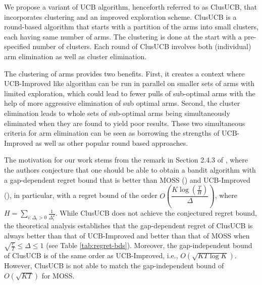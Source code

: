 We propose a variant of UCB algorithm, henceforth referred to as ClusUCB, that incorporates clustering and an improved exploration scheme. ClusUCB is a round-based algorithm that
starts with a partition of the arms into small clusters, each having same number of arms. 
The clustering is done at the start with a pre-specified number of clusters. 
Each round of ClusUCB involves both (individual) arm elimination as well as cluster elimination. 


The clustering of arms provides two benefits. First, it creates a context where UCB-Improved like algorithm can be run in parallel on smaller sets of arms with limited exploration, which could lead to fewer pulls of sub-optimal arms with the help of  more aggressive elimination of sub optimal arms. Second, the cluster elimination leads to whole sets of sub-optimal arms being simultaneously eliminated when they are found to yield poor results. These two simultaneous criteria for arm elimination can be seen as borrowing the strengths of UCB-Improved as well as other popular round based approaches.

The motivation for our work stems from the remark in Section 2.4.3 of \cite{bubeck2012bandits}, where the authors conjecture that one should be able to obtain a bandit algorithm with a
gap-dependent regret bound that is better than MOSS (\cite{audibert2009minimax}) and UCB-Improved (\cite{auer2010ucb}), in particular, with a regret bound of the order 
$O\left(\dfrac{K\log (\frac{T}{H})}{\Delta}\right)$, where $H = \sum_{i:\Delta_i>0} \frac{1}{\Delta_i^2}$. While ClusUCB does not achieve the conjectured regret bound, 
the theoretical analysis establishes
that the gap-dependent regret of ClusUCB is always better than that of UCB-Improved and better than that of MOSS when $\sqrt{\frac{e}{T}} \leq \Delta\leq 1$ (see Table \ref{tab:regret-bds}). Moreover, the gap-independent bound of ClusUCB is of the same order as UCB-Improved, i.e., $O\left(\sqrt{KT\log K}\right)$. However, ClusUCB is not able to match the gap-independent bound of $O(\sqrt{KT})$ for MOSS.




